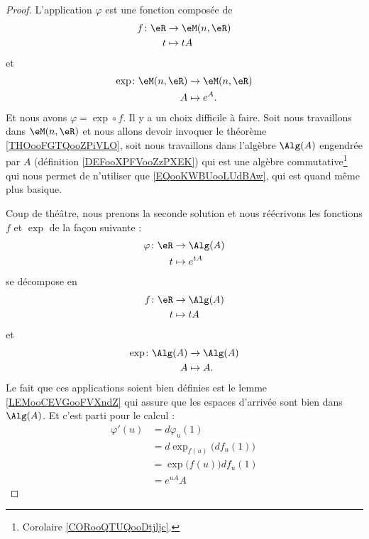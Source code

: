 \begin{proof}
	L'application \( \varphi\) est une fonction composée de
	\begin{equation}
		\begin{aligned}
			f\colon \eR & \to \eM(n,\eR) \\
			t           & \mapsto tA
		\end{aligned}
	\end{equation}
	et
	\begin{equation}
		\begin{aligned}
			\exp\colon \eM(n,\eR) & \to \eM(n,\eR) \\
			A                     & \mapsto e^A.
		\end{aligned}
	\end{equation}
	Et nous avons \( \varphi=\exp\circ f\). Il y a un choix difficile à faire. Soit nous travaillons dans \( \eM(n,\eR)\) et nous allons devoir invoquer le théorème \ref{THOooFGTQooZPiVLO}, soit nous travaillons dans l'algèbre \( \Alg(A)\)  engendrée par \( A\) (définition \ref{DEFooXPFVooZzPXEK})
	qui est une algèbre commutative\footnote{Corolaire \ref{CORooQTUQooDtjljc}.} qui nous permet de n'utiliser que \ref{EQooKWBUooLUdBAw}, qui est quand même plus basique.

	Coup de théâtre, nous prenons la seconde solution et nous réécrivons les fonctions \( f\) et \( \exp\) de la façon suivante :
	\begin{equation}
		\begin{aligned}
			\varphi\colon \eR & \to \Alg(A)     \\
			t                 & \mapsto  e^{tA}
		\end{aligned}
	\end{equation}
	se décompose en
	\begin{equation}
		\begin{aligned}
			f\colon \eR & \to \Alg(A) \\
			t           & \mapsto tA
		\end{aligned}
	\end{equation}
	et
	\begin{equation}
		\begin{aligned}
			\exp\colon \Alg(A) & \to \Alg(A) \\
			A                  & \mapsto A.
		\end{aligned}
	\end{equation}
	Le fait que ces applications soient bien définies est le lemme \ref{LEMooCEVGooFVXndZ} qui assure que les espaces d'arrivée sont bien dans \( \Alg(A)\). Et c'est parti pour le calcul :
	\begin{subequations}
		\begin{align}
			\varphi'(u) & =d\varphi_u(1)      \label{SUBEQooFDPQooBzTDXF}                    \\
			            & =d\exp_{f(u)}\big( df_u(1) \big)       \label{SUBEQooVOFWooDoTQGy} \\
			            & =\exp\big( f(u) \big)df_u(1)       \label{SUBEQooCILLooHsFDOE}     \\
			            & = e^{uA}A      \label{SUBEQooBMAQooNtbzBI}
		\end{align}
	\end{subequations}


\end{proof}
